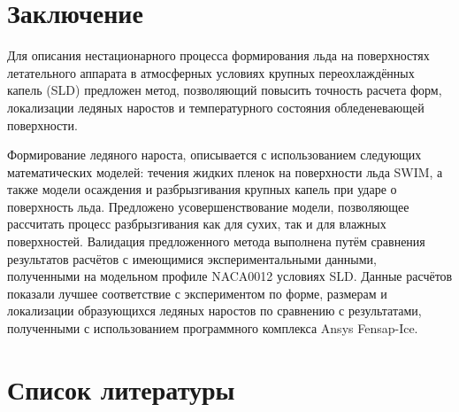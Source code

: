 \documentclass{psta}%
\begin{document}
\section*{Заключение}

Для описания нестационарного процесса формирования льда на поверхностях летательного аппарата в атмосферных условиях крупных переохлаждённых капель (SLD) предложен метод, позволяющий повысить точность расчета форм, локализации ледяных наростов и температурного состояния обледеневающей поверхности. 

Формирование ледяного нароста, описывается с использованием следующих математических моделей: течения жидких пленок на поверхности льда SWIM, а также модели осаждения и разбрызгивания крупных капель при ударе о поверхность льда. Предложено усовершенствование модели, позволяющее рассчитать процесс разбрызгивания как для сухих, так и для влажных поверхностей. Валидация предложенного метода выполнена путём сравнения результатов расчётов с имеющимися экспериментальными данными, полученными на модельном профиле NACA0012 условиях SLD. Данные расчётов показали лучшее соответствие с экспериментом по форме, размерам и локализации образующихся ледяных наростов по сравнению с результатами, полученными с использованием программного комплекса Ansys Fensap-Ice.

\section*{Список литературы}
\end{document}
